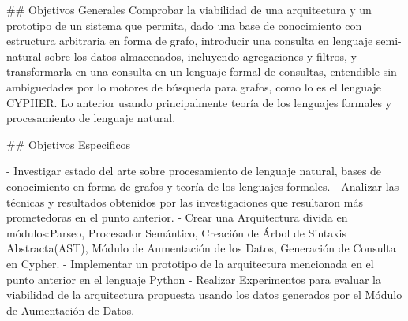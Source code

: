 ## Objetivos Generales
Comprobar la viabilidad de una arquitectura y un prototipo de un sistema que permita, dado una base de conocimiento con estructura arbitraria en forma de grafo,
introducir una consulta en lenguaje semi-natural sobre los datos almacenados, incluyendo agregaciones y filtros, y transformarla en una consulta en un lenguaje formal de consultas, entendible sin ambiguedades por lo motores de búsqueda para grafos, como lo es el lenguaje CYPHER. Lo anterior usando principalmente teoría de los lenguajes formales y procesamiento de lenguaje natural.

## Objetivos Especificos

- Investigar estado del arte sobre procesamiento de lenguaje natural, bases de conocimiento en forma de grafos y teoría de los lenguajes formales.
- Analizar las técnicas y resultados obtenidos por las investigaciones que resultaron más prometedoras en el punto anterior.
- Crear una Arquitectura divida en módulos:Parseo, Procesador Semántico, Creación de Árbol de Sintaxis Abstracta(AST), Módulo de Aumentación de los Datos, Generación de Consulta en Cypher.
- Implementar un prototipo de la arquitectura mencionada en el punto anterior en el lenguaje Python
- Realizar Experimentos para evaluar la viabilidad de la arquitectura propuesta usando los datos generados por el Módulo de Aumentación de Datos.

